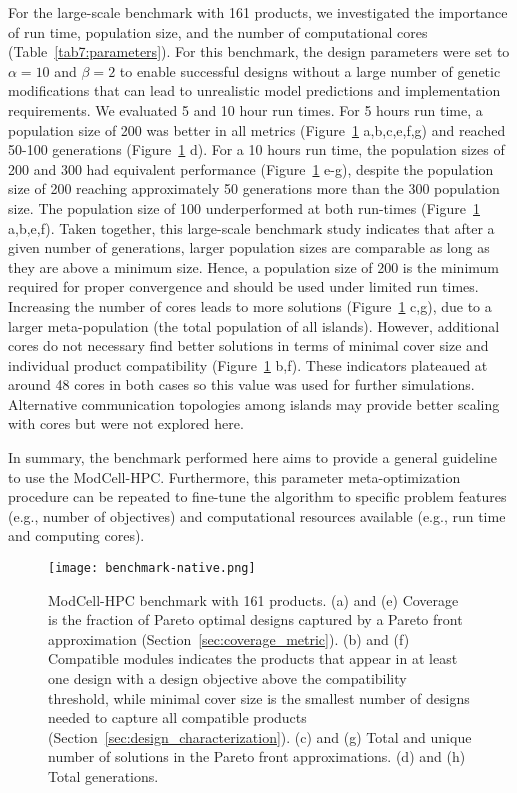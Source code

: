 {For the large-scale benchmark with 161 products, we investigated the importance of run time, population size, and the number of computational cores (Table~\ref{tab7:parameters}).
For this benchmark, the design parameters were set to $\alpha=10$ and $\beta=2$ to enable successful designs without a large number of genetic modifications that can lead to unrealistic model predictions and implementation requirements.
We evaluated 5 and 10 hour run times. For 5 hours run time, a population size of 200 was better in all metrics (Figure~\ref{fig7:benchmark-161prod} a,b,c,e,f,g) and reached 50-100 generations (Figure~\ref{fig7:benchmark-161prod} d).
For a 10 hours run time, the population sizes of 200 and 300 had equivalent performance (Figure~\ref{fig7:benchmark-161prod} e-g), despite the population size of 200 reaching  approximately 50 generations more than the 300 population size.
The population size of 100 underperformed at both run-times (Figure~\ref{fig7:benchmark-161prod} a,b,e,f).
Taken together, this large-scale benchmark study indicates that after a given number of generations, larger population sizes are comparable as long as they are above a minimum size.
Hence, a population size of 200 is the minimum required for proper convergence and should be used under limited run times.
Increasing the number of cores leads to more solutions (Figure~\ref{fig7:benchmark-161prod} c,g), due to a larger meta-population (the total population of all islands). However, additional cores do not necessary find better solutions in terms of minimal cover size and individual product compatibility
(Figure~\ref{fig7:benchmark-161prod} b,f).
These indicators plateaued at around 48 cores in both cases so this value was used for further simulations.
Alternative communication topologies among islands \citep{hijaze2009} may provide better scaling with cores but were not explored here.

In summary, the benchmark performed here aims to provide a general guideline to use the ModCell-HPC.
Furthermore, this parameter meta-optimization procedure can be repeated to fine-tune the algorithm to specific problem features (e.g., number of objectives) and computational resources available (e.g., run time and computing cores).

\begin{figure}[hp]
    \centering
    \texttt{[image: benchmark-native.png]}
    \caption[ModCell-HPC benchmark with 161 products]{ModCell-HPC benchmark with 161 products. (a) and (e) Coverage is the fraction of Pareto optimal designs captured by a Pareto front approximation (Section~\ref{sec:coverage_metric}).
    (b) and (f) Compatible modules indicates the products that appear in at least one design with a design objective above the compatibility threshold, while minimal cover size is the smallest number of designs needed to capture all compatible products (Section~\ref{sec:design_characterization}).
    (c) and (g) Total and unique number of solutions in the Pareto front approximations.
    (d) and (h) Total generations.}
    \label{fig7:benchmark-161prod}
\end{figure}

}
